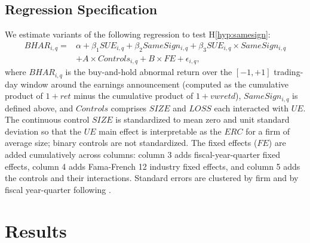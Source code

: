 \documentclass[english,12pt]{article}
\begin{document}
\subsection{Regression Specification}\label{sec:regression}

We estimate variants of the following regression to test H\ref{hyp:samesign}:
\begin{equation}\label{eq:regression}
\begin{aligned}
    BHAR_{i,q} = {} & \alpha + \beta_1 SUE_{i,q} + \beta_2 SameSign_{i,q} + \beta_3 SUE_{i,q} \times SameSign_{i,q} \\
    & + A \times Controls_{i,q} + B \times FE + \epsilon_{i,q},
\end{aligned}
\end{equation}
where $BHAR_{i,q}$ is the buy-and-hold abnormal return over the $[-1,+1]$ trading-day window around the earnings announcement (computed as the cumulative product of $1+ret$ minus the cumulative product of $1+vwretd$), $SameSign_{i,q}$ is defined above, and $Controls$ comprises $SIZE$ and $LOSS$ each interacted with $UE$. The continuous control $SIZE$ is standardized to mean zero and unit standard deviation so that the $UE$ main effect is interpretable as the $ERC$ for a firm of average size; binary controls are not standardized. The fixed effects ($FE$) are added cumulatively across columns: column 3 adds fiscal-year-quarter fixed effects, column 4 adds Fama-French 12 industry fixed effects, and column 5 adds the controls and their interactions. Standard errors are clustered by firm and by fiscal year-quarter following \citet{petersen2009estimating}.


\section{Results}\label{section-results}
\end{document}
